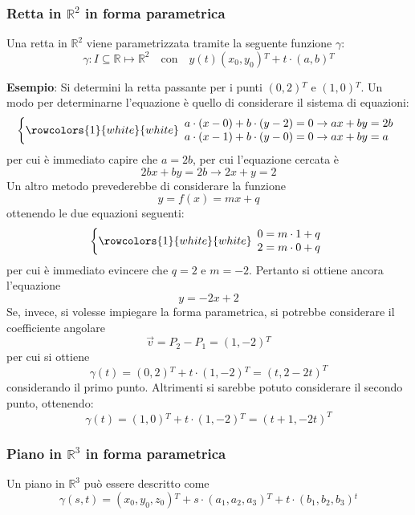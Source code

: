 \documentclass[a4paper]{extarticle}
\begin{document}
\vspace{2em}
\noindent
\subsubsection{Retta in $\mathbb{R}^2$ in forma parametrica}
Una retta in $\mathbb{R}^2$ viene parametrizzata tramite la seguente funzione $\gamma$:
\[\gamma : I \subseteq \mathbb{R} \longmapsto \mathbb{R}^2 \hspace{1em} \text{con} \hspace{1em} y(t) (x_0,y_0){^T} + t \cdot (a,b){^T}\]

\vspace{1em}
\noindent
\textbf{Esempio}: Si determini la retta passante per i punti $(0,2){^T}$ e $(1,0){^T}$. Un modo per determinarne l'equazione è quello di considerare il sistema di equazioni:
\[\left\{
    \rowcolors{1}{white}{white}
    \begin{array}{l}
        a \cdot (x-0) + b \cdot (y-2) = 0 \rightarrow ax + by = 2b\\
        a \cdot (x-1) + b \cdot (y-0) = 0 \rightarrow ax + by = a\\
    \end{array}
\right.\]
per cui è immediato capire che $a=2b$, per cui l'equazione cercata è
\[2bx + by = 2b \rightarrow 2x + y = 2\]
Un altro metodo prevederebbe di considerare la funzione
\[y=f(x)=mx+q\]
ottenendo le due equazioni seguenti:
\[\left\{
    \rowcolors{1}{white}{white}
    \begin{array}{l}
        0=m \cdot 1 + q\\
        2=m \cdot 0 + q
    \end{array}
\right.\]
per cui è immediato evincere che $q=2$ e $m=-2$. Pertanto si ottiene ancora l'equazione
\[y=-2x+2\]
Se, invece, si volesse impiegare la forma parametrica, si potrebbe considerare il coefficiente angolare
\[\vec v = P_2-P_1=(1,-2){^T}\]
per cui si ottiene 
\[\gamma(t) = (0,2){^T} + t \cdot (1,-2){^T} = (t,2-2t)^{T}\]
considerando il primo punto. Altrimenti si sarebbe potuto considerare il secondo punto, ottenendo:
\[\gamma(t) = (1,0){^T} + t \cdot (1,-2){^T} = (t+1,-2t)^{T}\]

\vspace{2em}
\noindent
\subsubsection{Piano in $\mathbb{R}^3$ in forma parametrica}
Un piano in $\mathbb{R}^3$ può essere descritto come
\[\gamma(s,t) = (x_0,y_0,z_0){^T} + s \cdot (a_1,a_2,a_3){^T} + t \cdot (b_1,b_2,b_3){^t}\]
\end{document}

